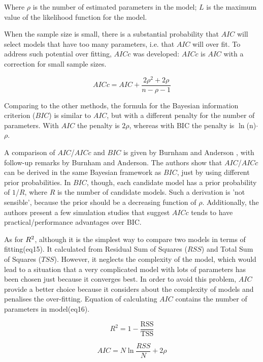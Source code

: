 \documentclass[11pt]{article}
\begin{document}
    Where $\rho$ is the number of estimated parameters in the model; $L$ is the maximum value of the likelihood function for the model\citep{mcelreath2016statistical}. 
    
    When the sample size is small, there is a substantial probability that $AIC$ will select models that have too many parameters, i.e. that $AIC$ will over fit\citep{mcquarrie1998regression}. To address such potential over fitting, $AICc$ was developed: $AICc$ is $AIC$ with a correction for small sample sizes\citep{cavanaugh1997unifying}.
    
    \begin{equation}
        AICc = AIC + \frac{2\rho^{2}+2\rho}{n-\rho-1}
    \end{equation}
    
    Comparing to the other methods, the formula for the Bayesian information criterion ($BIC$) is similar to $AIC$, but with a different penalty for the number of parameters. With $AIC$ the penalty is $2\rho$, whereas with BIC the penalty is $\ln$(n)$\cdot$$\rho$.
    
    A comparison of $AIC$/$AICc$ and $BIC$ is given by Burnham and Anderson \citep{burnham2002model}, with follow-up remarks by Burnham and Anderson\citep{burnham2004multimodel}. The authors show that $AIC$/$AICc$ can be derived in the same Bayesian framework as $BIC$, just by using different prior probabilities. In $BIC$, though, each candidate model has a prior probability of $1$/$R$, where $R$ is the number of candidate models. Such a derivation is 'not sensible', because the prior should be a decreasing function of $\rho$. Additionally, the authors present a few simulation studies that suggest $AICc$ tends to have practical/performance advantages over BIC\citep{burnham2004multimodel}.
    
    As for $R\textsuperscript{2}$, although it is the simplest way to compare two models in terms of fitting(eq15). It calculated from Residual Sum of Squares ($RSS$) and Total Sum of Squares ($TSS$). However, it neglects the complexity of the model, which would lead to a situation that a very complicated model with lots of parameters has been chosen just because it converges best. In order to avoid this problem, $AIC$ provide a better choice because it considers about the complexity of models and penalises the over-fitting\citep{bozdogan1987model}. Equation of calculating $AIC$ contains the number of parameters in model(eq16). 
    
    \noindent\begin{minipage}{0.5\linewidth}
    \begin{equation}
        R^2 = 1 - \frac{\textrm{RSS}}{\textrm{TSS}}
	\end{equation}
    \end{minipage}%
	\begin{minipage}{0.5\linewidth}
	\begin{equation}
        AIC = N\ln{\frac{RSS}{N}} + 2\rho
	\end{equation}
	\end{minipage}\par\vspace{\belowdisplayskip}
	
\end{document}
